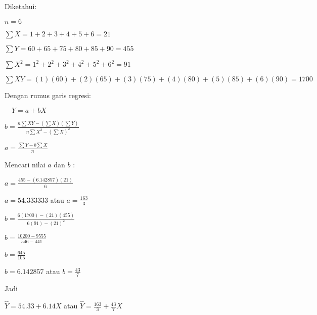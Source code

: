 \documentclass[a4paper]{article}
\begin{document}
\begin{enumerate}[itemsep=1em,leftmargin=*]
  Diketahui:

  \(n = 6\)

  \(\sum X = 1 + 2 + 3 + 4 + 5 + 6 = 21\)

  \(\sum Y = 60 + 65 + 75 + 80 + 85 + 90 = 455\)

  \(\sum X^2 = 1^2 + 2^2 + 3^2 + 4^2 + 5^2 + 6^2 = 91\)

  \(\sum XY = (1)(60) + (2)(65) + (3)(75) + (4)(80) + (5)(85) + (6)(90) = 1700\)

  Dengan rumus garis regresi:

  \(\quad Y = a + bX\)

  \(b = \frac{n\sum XY - (\sum X)(\sum Y)}{n\sum X^2 - (\sum X)^2}\)

  \(a = \frac{\sum Y - b\sum X}{n}\)

  Mencari nilai \(a\) dan \(b\) :

  \(a = \frac{455 - (6.142857)(21)}{6}\)

  \(a = 54.333333\) atau \(a = \frac{163}{3}\)

  \(b = \frac{6(1700) - (21)(455)}{6(91) - (21)^2}\)

  \(b = \frac{10200 - 9555}{546 - 441}\)

  \(b = \frac{645}{105}\)

  \(b = 6.142857\) atau \(b = \frac{43}{7}\)

  Jadi

  \(\hat{Y} = 54.33 + 6.14X\) atau \(\hat{Y} = \frac{163}{3} + \frac{43}{7}X\)

\end{enumerate}
\end{document}
